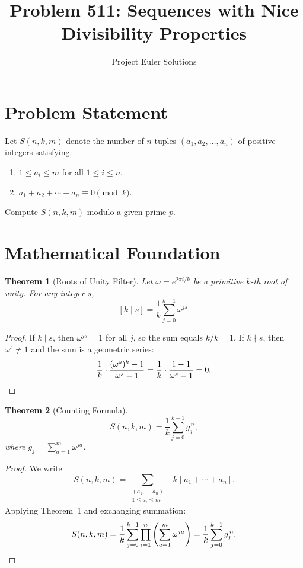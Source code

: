 \documentclass[11pt]{article}
\title{Problem 511: Sequences with Nice Divisibility Properties}
\author{Project Euler Solutions}
\date{}
\newtheorem{theorem}{Theorem}
\begin{document}
\maketitle

\section{Problem Statement}

Let $S(n, k, m)$ denote the number of $n$-tuples $(a_1, a_2, \ldots, a_n)$ of positive integers satisfying:
\begin{enumerate}
    \item $1 \leq a_i \leq m$ for all $1 \leq i \leq n$.
    \item $a_1 + a_2 + \cdots + a_n \equiv 0 \pmod{k}$.
\end{enumerate}
Compute $S(n, k, m)$ modulo a given prime $p$.

\section{Mathematical Foundation}

\begin{theorem}[Roots of Unity Filter]
Let $\omega = e^{2\pi i / k}$ be a primitive $k$-th root of unity. For any integer $s$,
\[
[k \mid s] = \frac{1}{k}\sum_{j=0}^{k-1} \omega^{js}.
\]
\end{theorem}

\begin{proof}
If $k \mid s$, then $\omega^{js} = 1$ for all $j$, so the sum equals $k/k = 1$. If $k \nmid s$, then $\omega^s \neq 1$ and the sum is a geometric series:
\[
\frac{1}{k} \cdot \frac{(\omega^s)^k - 1}{\omega^s - 1} = \frac{1}{k} \cdot \frac{1 - 1}{\omega^s - 1} = 0. \qedhere
\]
\end{proof}

\begin{theorem}[Counting Formula]
\[
S(n, k, m) = \frac{1}{k}\sum_{j=0}^{k-1} g_j^{\,n},
\]
where $g_j = \sum_{a=1}^{m} \omega^{ja}$.
\end{theorem}

\begin{proof}
We write
\[
S(n, k, m) = \sum_{\substack{(a_1,\ldots,a_n) \\ 1 \leq a_i \leq m}} [k \mid a_1 + \cdots + a_n].
\]
Applying Theorem~1 and exchanging summation:
\[
S(n, k, m) = \frac{1}{k}\sum_{j=0}^{k-1} \prod_{i=1}^{n}\left(\sum_{a=1}^{m}\omega^{ja}\right) = \frac{1}{k}\sum_{j=0}^{k-1} g_j^{\,n}. \qedhere
\]
\end{proof}
\end{document}
